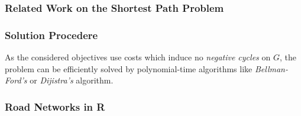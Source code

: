 \subsubsection{Related Work on the Shortest Path Problem}

\citet{TACCARI2016122, zhu2014vehicle, Osegueda.1999}

\subsubsection{Solution Procedere}


As the considered objectives use costs which induce no \emph{negative cycles}  on $G$, the problem can be efficiently solved
by polynomial-time algorithms like
\emph{Bellman-Ford's} \cite{Bell1958,Ford1956} or \emph{Dijistra's} \cite{dijkstra1959note} algorithm.


\subsubsection{Road Networks in R}
\citet{gilardi_lovelace_padgham_2020}
\citet{lovelace_open_2021}


%
%
%
%


